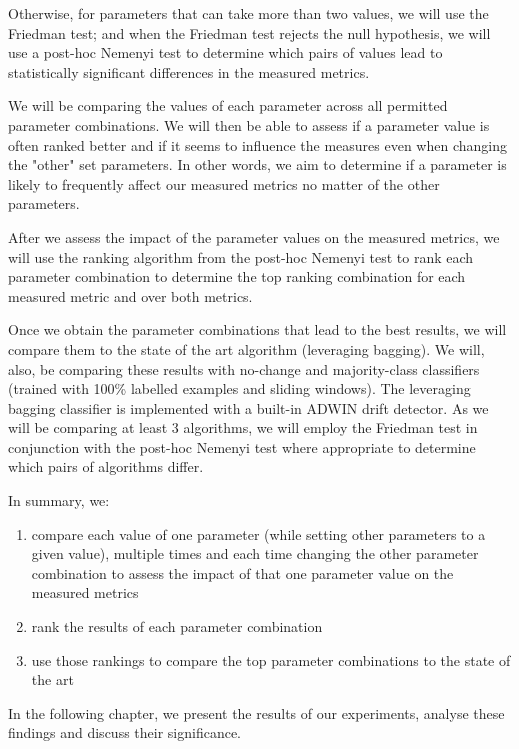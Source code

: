 Otherwise, for parameters that can take more than two values, we will use the Friedman test; and when the Friedman test rejects the null hypothesis, we will use a post-hoc Nemenyi test to determine which pairs of values lead to statistically significant differences in the measured metrics.

We will be comparing the values of each parameter across all permitted parameter combinations. We will then be able to assess if a parameter value is often ranked better and if it seems to influence the measures even when changing the "other" set parameters. In other words, we aim to determine if a parameter is likely to frequently affect our measured metrics no matter of the other parameters.

After we assess the impact of the parameter values on the measured metrics, we will use the ranking algorithm from the post-hoc Nemenyi test to rank each parameter combination to determine the top ranking combination for each measured metric and over both metrics.

Once we obtain the parameter combinations that lead to the best results, we will compare them to the state of the art algorithm (leveraging bagging). We will, also, be comparing these results with no-change and majority-class classifiers (trained with 100\% labelled examples and sliding windows). The leveraging bagging classifier is implemented with a built-in ADWIN drift detector. As we will be comparing at least 3 algorithms, we will employ the Friedman test in conjunction with the post-hoc Nemenyi test where appropriate to determine which pairs of algorithms differ.

In summary, we:
\begin{enumerate}
\item compare each value of one parameter (while setting other parameters to a given value), multiple times and each time changing the other parameter combination to assess the impact of that one parameter value on the measured metrics
\item rank the results of each parameter combination
\item use those rankings to compare the top parameter combinations to the state of the art
\end{enumerate}

In the following chapter, we present the results of our experiments, analyse these findings and discuss their significance.